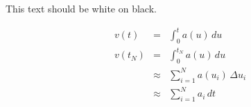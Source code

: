 \documentclass[12pt]{article}
\newcommand{\series}[3]{\sum_{{#1}={#2}}^{#3} }
\begin{document}
This text should be white on black.


\begin{eqnarray*}
 v(t) & = & \int_0^{t} a(u)\,du\\
 v(t_N) & = & \int_0^{t_N} a(u)\,du\\
  & \approx & \series{i}{1}{N} a(u_i)\,\Delta u_i\\
  & \approx & \series{i}{1}{N} a_i\,dt
\end{eqnarray*}
\end{document}

